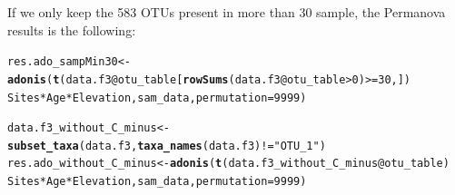 \documentclass[12pt]{article}\usepackage[]{graphicx}\usepackage[]{color}
\makeatletter
\newcommand{\hlnum}[1]{\textcolor[rgb]{0.686,0.059,0.569}{#1}}%
\newcommand{\hlstr}[1]{\textcolor[rgb]{0.192,0.494,0.8}{#1}}%
\newcommand{\hlopt}[1]{\textcolor[rgb]{0,0,0}{#1}}%
\newcommand{\hlstd}[1]{\textcolor[rgb]{0.345,0.345,0.345}{#1}}%
\newcommand{\hlkwb}[1]{\textcolor[rgb]{0.69,0.353,0.396}{#1}}%
\newcommand{\hlkwc}[1]{\textcolor[rgb]{0.333,0.667,0.333}{#1}}%
\newcommand{\hlkwd}[1]{\textcolor[rgb]{0.737,0.353,0.396}{\textbf{#1}}}%
\newenvironment{kframe}{%
 \def\at@end@of@kframe{}%
 \ifinner\ifhmode%
  \def\at@end@of@kframe{\end{minipage}}%
  \begin{minipage}{\columnwidth}%
 \fi\fi%
 \def\FrameCommand##1{\hskip\@totalleftmargin \hskip-\fboxsep
 \colorbox{shadecolor}{##1}\hskip-\fboxsep
     \hskip-\linewidth \hskip-\@totalleftmargin \hskip\columnwidth}%
 \MakeFramed {\advance\hsize-\width
   \@totalleftmargin\z@ \linewidth\hsize
   \@setminipage}}%
 {\par\unskip\endMakeFramed%
 \at@end@of@kframe}
\newenvironment{knitrout}{}{} %
\numberwithin{figure}{section}
\makeatother
\begin{document}
If we only keep the 583 OTUs present in more than 30 sample, the Permanova results is the following:
\begin{knitrout}\small
{}\color{fgcolor}\begin{kframe}
\begin{alltt}
\hlstd{res.ado_sampMin30} \hlkwb{<-} \hlkwd{adonis}\hlstd{(}\hlkwd{t}\hlstd{(data.f3}\hlopt{@}\hlkwc{otu_table}\hlstd{[}\hlkwd{rowSums}\hlstd{(data.f3}\hlopt{@}\hlkwc{otu_table}\hlopt{>}\hlnum{0}\hlstd{)}\hlopt{>=}\hlnum{30}\hlstd{,])} \hlopt{~}
                              \hlstd{Sites} \hlopt{*} \hlstd{Age} \hlopt{*} \hlstd{Elevation, sam_data,} \hlkwc{permutation} \hlstd{=} \hlnum{9999}\hlstd{)}
\end{alltt}
\end{kframe}
\end{knitrout}

\begin{knitrout}\small
{}\color{fgcolor}\begin{kframe}
\begin{alltt}
\hlstd{data.f3_without_C_minus} \hlkwb{<-} \hlkwd{subset_taxa}\hlstd{(data.f3,} \hlkwd{taxa_names}\hlstd{(data.f3)}\hlopt{!=}\hlstr{"OTU_1"}\hlstd{)}
\hlstd{res.ado_without_C_minus} \hlkwb{<-} \hlkwd{adonis}\hlstd{(}\hlkwd{t}\hlstd{(data.f3_without_C_minus}\hlopt{@}\hlkwc{otu_table}\hlstd{)} \hlopt{~}
                              \hlstd{Sites} \hlopt{*} \hlstd{Age} \hlopt{*} \hlstd{Elevation, sam_data,} \hlkwc{permutation} \hlstd{=} \hlnum{9999}\hlstd{)}
\end{alltt}
\end{kframe}
\end{knitrout}
\end{document}
